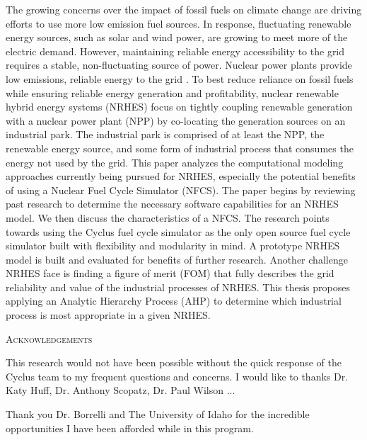 \documentclass[12pt]{UIdahoMastersThesis}
\begin{document}
The growing concerns over the impact of fossil fuels on climate change are driving efforts to use more low emission fuel sources. In response, fluctuating renewable energy sources, such as solar and wind power, are growing to meet more of the electric demand. However, maintaining reliable energy accessibility to the grid requires a stable, non-fluctuating source of power. Nuclear power plants provide low emissions, reliable energy to the grid \cite{IPCC}. To best reduce reliance on fossil fuels while ensuring reliable energy generation and profitability, nuclear renewable hybrid energy systems (NRHES) focus on tightly coupling renewable generation with a nuclear power plant (NPP) by co-locating the generation sources on an industrial park. The industrial park is comprised of at least the NPP, the renewable energy source, and some form of industrial process that consumes the energy not used by the grid. 
This paper analyzes the computational modeling approaches currently being pursued for NRHES, especially the potential benefits of using a Nuclear Fuel Cycle Simulator (NFCS). The paper begins by reviewing past research to determine the necessary software capabilities for an NRHES model. We then discuss the characteristics of a NFCS. The research points towards using the Cyclus fuel cycle simulator as the only open source fuel cycle simulator built with flexibility and modularity in mind. A prototype NRHES model is built and evaluated for benefits of further research. Another challenge NRHES face is finding a figure of merit (FOM) that fully describes the grid reliability and value of the industrial processes of NRHES. This thesis proposes applying an Analytic Hierarchy Process (AHP) to determine which industrial process is most appropriate in a given NRHES.

\newpage


 \begin{center}
 	{\LARGE\textsc{Acknowledgements}}
 \end{center}
 
This research would not have been possible without the quick response of the Cyclus team to my frequent questions and concerns.  I would like to thanks Dr. Katy Huff, Dr. Anthony Scopatz, Dr. Paul Wilson ...

Thank you Dr. Borrelli and The University of Idaho for the incredible opportunities I have been afforded while in this program.
\end{document}
